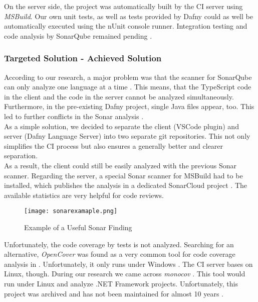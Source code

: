 On the server side, the project was automatically built by the CI server using \textit{MSBuild}.
Our own unit tests, as well as tests provided by Dafny could as well be automatically executed using the nUnit console runner.
Integration testing and code analysis by SonarQube remained pending \cite{sa}.

\subsubsection{Targeted Solution - Achieved Solution}
According to our research, a major problem was that the scanner for SonarQube can only analyze one language at a time \cite{sonar-supports-only-one-language}.
This means, that the TypeScript code in the client and the \CsharpWithSpace code in the server cannot be analyzed simultaneously.
Furthermore, in the pre-existing Dafny project, single Java files appear, too.
This led to further conflicts in the Sonar analysis \cite{sa}.\\

As a simple solution, we decided to separate the client (VSCode plugin) and server (Dafny Language Server) into two separate git repositories.
This not only simplifies the CI process but also ensures a generally better and clearer separation. \\

As a result, the client could still be easily analyzed with the previous Sonar scanner.
Regarding the server, a special Sonar scanner for MSBuild had to be installed, which publishes the analysis in a dedicated SonarCloud project \cite{dev}.
The available statistics are very helpful for code reviews.\\



\begin{figure}[H]
    \centering
    \texttt{[image: sonarexamaple.png]}
    \caption{Example of a Useful Sonar Finding}
    \label{fig:sonarexample}
\end{figure}


Unfortunately, the code coverage by tests is not analyzed.
Searching for an alternative, \textit{OpenCover} was found as a very common tool for code coverage analysis in \Csharp.
Unfortunately, it only runs under Windows  \cite{opencover}.
The CI server bases on Linux, though.
During our research we came across \textit{monocov} \cite{monocov}.
This tool would run under Linux and analyze .NET Framework projects.
Unfortunately, this project was archived and has not been maintained for almost 10 years \cite{monocov}.


